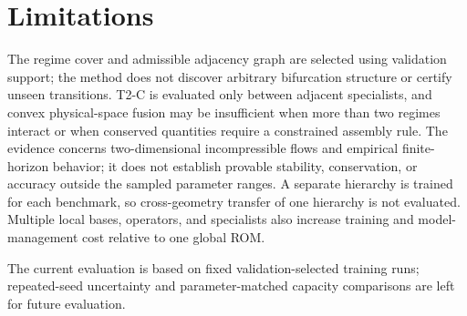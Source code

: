 \section{Limitations}

The regime cover and admissible adjacency graph are selected using validation support;
the method does not discover arbitrary bifurcation structure or certify unseen
transitions. T2-C is evaluated only between adjacent specialists, and convex
physical-space fusion may be insufficient when more than two regimes interact or when
conserved quantities require a constrained assembly rule. The evidence concerns
two-dimensional incompressible flows and empirical finite-horizon behavior; it does not
establish provable stability, conservation, or accuracy outside the sampled parameter
ranges. A separate hierarchy is trained for each benchmark, so cross-geometry transfer
of one hierarchy is not evaluated. Multiple local bases, operators, and specialists also
increase training and model-management cost relative to one global ROM.

The current evaluation is based on fixed validation-selected training runs; repeated-seed
uncertainty and parameter-matched capacity comparisons are left for future evaluation.
